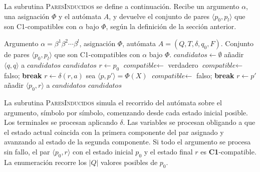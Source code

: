 \documentclass[11pt, letterpaper]{article}
\theoremstyle{definition}
\newcommand{\eps}{\varepsilon}
\newcommand{\trans}{\delta}
\begin{document}
La subrutina \textsc{ParesInducidos} se define a continuación. Recibe un argumento $\alpha$, una asignación $\Phi$ y el autómata $A$, y devuelve el conjunto de pares $\langle p_0, p_l \rangle$ que son C1-compatibles con $\alpha$ bajo $\Phi$, según la definición de la sección anterior.

\begin{algorithm}[H]
\caption{\textsc{ParesInducidos}($\alpha, \Phi, A$)}
\begin{algorithmic}[1]
\Require Argumento $\alpha = \beta^1 \beta^2 \cdots \beta^l$, asignación $\Phi$, autómata $A = (Q, T, \trans, q_0, F)$.
\Ensure  Conjunto de pares $\langle p_0, p_l \rangle$ que son C1-compatibles con $\alpha$ bajo $\Phi$.
\State $\textit{candidatos} \gets \emptyset$
\If{$\alpha = \eps$}
        \State añadir $\langle q, q \rangle$ a $\textit{candidatos}$
    \EndFor
    \State \Return $\textit{candidatos}$
\EndIf
{}
    \State $r \gets p_0$
    \State $\textit{compatible} \gets$ verdadero
            \If{$\trans(r, a)$ no está definido}
                \State $\textit{compatible} \gets$ falso; \textbf{break}
            \EndIf
            \State $r \gets \trans(r, a)$
            \State sea $\langle p, p' \rangle = \Phi(X)$
                \State $\textit{compatible} \gets$ falso; \textbf{break}
            \EndIf
            \State $r \gets p'$
        \EndIf
    \EndFor
        \State añadir $\langle p_0, r \rangle$ a $\textit{candidatos}$
    \EndIf
\EndFor
\State \Return $\textit{candidatos}$
\end{algorithmic}
\end{algorithm}

La subrutina \textsc{ParesInducidos} simula el recorrido del autómata sobre el argumento, símbolo por símbolo, comenzando desde cada estado inicial posible. Los terminales se procesan aplicando $\trans$. Las variables se procesan obligando a que el estado actual coincida con la primera componente del par asignado y avanzando al estado de la segunda componente. Si todo el argumento se procesa sin fallo, el par $\langle p_0, r \rangle$ con el estado inicial $p_0$ y el estado final $r$ es \textbf{C1}-compatible. La enumeración recorre los $|Q|$ valores posibles de $p_0$.
\end{document}
